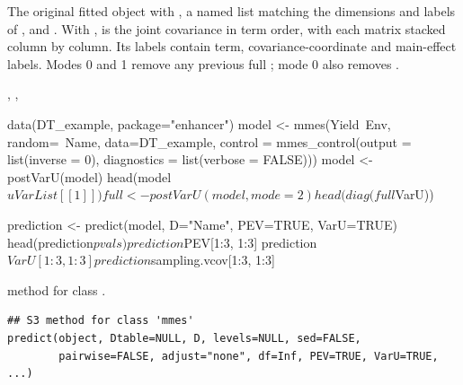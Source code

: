 \documentclass[a4paper]{book}
\begin{document}
%
\begin{Value}
The original fitted object with , a named list matching the
dimensions and labels of , and . With
,  is the joint covariance in term order, with each
 matrix stacked column by column. Its labels contain term,
covariance-coordinate and main-effect labels. Modes 0 and 1 remove any
previous full ; mode 0 also removes .
\end{Value}
%
\begin{SeeAlso}\relax
{}, ,
\end{SeeAlso}
%
\begin{Examples}
\begin{ExampleCode}
data(DT_example, package="enhancer")
model <- mmes(Yield~Env,
  random=~Name,
  data=DT_example,
  control = mmes_control(output = list(inverse = 0),
  diagnostics = list(verbose = FALSE)))
model <- postVarU(model)
head(model$uVarList[[1]])
full <- postVarU(model, mode=2)
head(diag(full$VarU))

prediction <- predict(model, D="Name", PEV=TRUE, VarU=TRUE)
head(prediction$pvals)
prediction$PEV[1:3, 1:3]
prediction$VarU[1:3, 1:3]
prediction$sampling.vcov[1:3, 1:3]
\end{ExampleCode}
\end{Examples}
%
\begin{Description}\relax
{} method for class .
\end{Description}
%
\begin{Usage}
\begin{verbatim}
## S3 method for class 'mmes'
predict(object, Dtable=NULL, D, levels=NULL, sed=FALSE,
        pairwise=FALSE, adjust="none", df=Inf, PEV=TRUE, VarU=TRUE, ...)
\end{verbatim}
\end{Usage}
%
\end{document}
